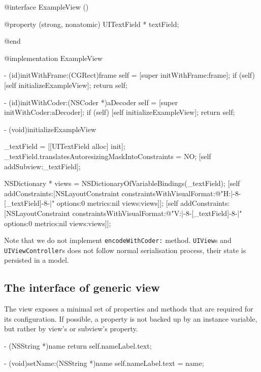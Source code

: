 \documentclass[10pt]{extarticle}
\newcommand{\inlinecode}[1]{{\textcolor{TundoraColor}{\texttt{#1}}}}
\begin{document}
\begin{codelisting}
@interface ExampleView ()

@property (strong, nonatomic) UITextField * textField;

@end

@implementation ExampleView

- (id)initWithFrame:(CGRect)frame
{
    self = [super initWithFrame:frame];
    if (self) {
        [self initializeExampleView];
    }
    return self;
}

- (id)initWithCoder:(NSCoder *)aDecoder
{
    self = [super initWithCoder:aDecoder];
    if (self) {
        [self initializeExampleView];
    }
    return self;
}

- (void)initializeExampleView
{
    _textField = [[UITextField alloc] init];
    _textField.translatesAutoresizingMaskIntoConstraints = NO;
    [self addSubview:_textField];
    
    NSDictionary * views = NSDictionaryOfVariableBindings(_textField);
    [self addConstraints:[NSLayoutConstraint constraintsWithVisualFormat:@"H:|-8-[_textField]-8-|"
                                                                 options:0
                                                                 metrics:nil
                                                                   views:views]];
    [self addConstraints:[NSLayoutConstraint constraintsWithVisualFormat:@"V:|-8-[_textField]-8-|"
                                                                 options:0
                                                                 metrics:nil
                                                                   views:views]];
}
\end{codelisting}

Note that we do not implement \inlinecode{encodeWithCoder:} method. \inlinecode{UIView}s and \inlinecode{UIViewController}s does not follow normal serialisation process, their state is persisted in a model.


\subsection{The interface of generic view}

The view exposes a minimal set of properties and methods that are required for its configuration.
If possible, a property is not backed up by an instance variable, but rather by view's or subview's property.

\begin{codelisting}
- (NSString *)name
{
    return self.nameLabel.text;
}

- (void)setName:(NSString *)name
{
    self.nameLabel.text = name;
}
\end{codelisting}
\end{document}
